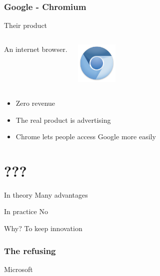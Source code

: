 \documentclass{beamer}
\begin{document}
\begin{frame}

  \frametitle{Google - Chromium}

  \begin{block}{Their product}
    \begin{columns}[c]

      An internet browser.

      \includegraphics[width=2cm]{logo_chromium.png}

    \end{columns}
  \end{block}

  \vfill

  \begin{itemize}
    \item<2->{Zero revenue}
    \item<3->{The real product is advertising}
    \item<4>{Chrome lets people access Google more easily}
  \end{itemize}

\end{frame}

\section{???}

\begin{frame}

  \begin{block}{In theory}
    Many advantages
  \end{block}

  \begin{block}{In practice}
    No
  \end{block}

  Why?
  To keep innovation

\end{frame}

\begin{frame}

  \frametitle{The refusing}

  Microsoft

\end{frame}
\end{document}

